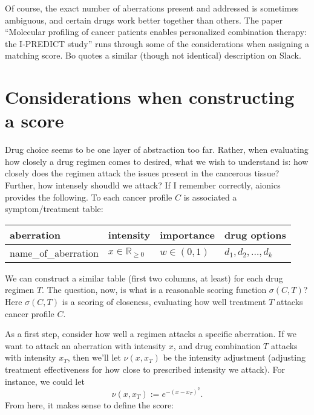 \documentclass[titlepage, hidelinks, 12pt]{article}
\theoremstyle{plain}
\theoremstyle{remark}
\theoremstyle{definition}
\newcommand{\R}{\mathbb{R}}
\begin{document}
Of course, the exact number of aberrations present and addressed is sometimes ambiguous, and certain drugs work better together than others.
The paper ``Molecular profiling of cancer patients enables personalized combination therapy: the I-PREDICT study'' runs through some of the
considerations when assigning a matching score. Bo quotes a similar (though not identical) description on Slack. 













\section{Considerations when constructing a score}
Drug choice seems to be one layer of abstraction too far. Rather, when evaluating how closely a drug regimen comes to desired, what we
wish to understand is: how closely does the regimen attack the issues present in the cancerous tissue? Further, how intensely shoudld we attack?
If I remember correctly, aionics provides the following. To each cancer profile $C$ is associated a symptom/treatment table: 

\begin{table}[h]
    \centering
\begin{tabular}{l|l|l|l}
aberration           & intensity       & importance   & drug options            \\\hline
name\_of\_aberration & $x\in\R_{\ge0}$ & $w\in(0, 1)$ & $d_1, d_2, \ldots, d_k$ \\
\end{tabular}
\end{table}

We can construct a similar table (first two columns, at least) for each drug regimen $T$. 
The question, now, is what is a reasonable scoring function $\sigma(C, T)$? Here $\sigma(C, T)$ is a scoring of closeness, evaluating
how well treatment $T$ attacks cancer profile $C$. 

As a first step, consider how well a regimen attacks a specific aberration. If we want to attack an aberration with
intensity $x$, and drug combination $T$ attacks with intensity $x_T$, then we'll let $\nu(x, x_T)$ be the intensity adjustment (adjusting
treatment effectiveness for how close to prescribed intensity we attack). For instance, we could let
\begin{equation}
    \nu(x, x_T) := e^{-(x-x_T)^2}.
    \label{eqn:intensityAdjustment}
\end{equation}
From here, it makes sense to define the score:
\end{document}
